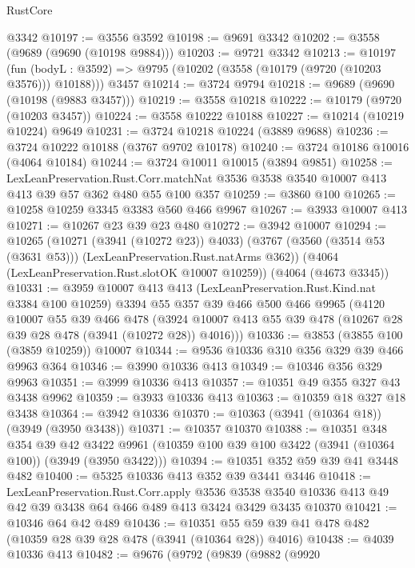 \begin{lexlean}{RustCore}
\begin{coremodule}
    @3342
@10197 := @3556 @3592
@10198 := @9691 @3342
@10202 := @3558 (@9689 (@9690 (@10198 @9884)))
@10203 := @9721 @3342
@10213 := @10197
    (fun (bodyL : @3592) => @9795 (@10202 (@3558 (@10179 (@9720 (@10203 @3576))) @10188)))
    @3457
@10214 := @3724 @9794
@10218 := @9689 (@9690 (@10198 (@9883 @3457)))
@10219 := @3558 @10218
@10222 := @10179 (@9720 (@10203 @3457))
@10224 := @3558 @10222 @10188
@10227 := @10214 (@10219 @10224) @9649
@10231 := @3724 @10218 @10224 (@3889 @9688)
@10236 := @3724 @10222 @10188 (@3767 @9702 @10178)
@10240 := @3724 @10186 @10016 (@4064 @10184)
@10244 := @3724 @10011 @10015 (@3894 @9851)
@10258 := LexLeanPreservation.Rust.Corr.matchNat
    @3536
    @3538
    @3540
    @10007
    @413
    @413
    @39
    @57
    @362
    @480
    @55
    @100
    @357
@10259 := @3860 @100
@10265 := @10258 @10259 @3345 @3383 @560 @466 @9967
@10267 := @3933 @10007 @413
@10271 := @10267 @23 @39 @23 @480
@10272 := @3942 @10007
@10294 := @10265
    (@10271 (@3941 (@10272 @23)) @4033)
    (@3767 (@3560 (@3514 @53 (@3631 @53))) (LexLeanPreservation.Rust.natArms @362))
    (@4064 (LexLeanPreservation.Rust.slotOK @10007 @10259))
    (@4064 (@4673 @3345))
@10331 := @3959
    @10007
    @413
    @413
    (LexLeanPreservation.Rust.Kind.nat @3384 @100 @10259)
    @3394
    @55
    @357
    @39
    @466
    @500
    @466
    @9965
    (@4120
      @10007
      @55
      @39
      @466
      @478
      (@3924 @10007 @413 @55 @39 @478 (@10267 @28 @39 @28 @478 (@3941 (@10272 @28)) @4016)))
@10336 := @3853 (@3855 @100 (@3859 @10259)) @10007
@10344 := @9536 @10336 @310 @356 @329 @39 @466 @9963 @364
@10346 := @3990 @10336 @413
@10349 := @10346 @356 @329 @9963
@10351 := @3999 @10336 @413
@10357 := @10351 @49 @355 @327 @43 @3438 @9962
@10359 := @3933 @10336 @413
@10363 := @10359 @18 @327 @18 @3438
@10364 := @3942 @10336
@10370 := @10363 (@3941 (@10364 @18)) (@3949 (@3950 @3438))
@10371 := @10357 @10370
@10388 := @10351
    @348
    @354
    @39
    @42
    @3422
    @9961
    (@10359 @100 @39 @100 @3422 (@3941 (@10364 @100)) (@3949 (@3950 @3422)))
@10394 := @10351 @352 @59 @39 @41 @3448 @482
@10400 := @5325 @10336 @413 @352 @39 @3441 @3446
@10418 := LexLeanPreservation.Rust.Corr.apply
    @3536
    @3538
    @3540
    @10336
    @413
    @49
    @42
    @39
    @3438
    @64
    @466
    @489
    @413
    @3424
    @3429
    @3435
    @10370
@10421 := @10346 @64 @42 @489
@10436 := @10351 @55 @59 @39 @41 @478 @482 (@10359 @28 @39 @28 @478 (@3941 (@10364 @28)) @4016)
@10438 := @4039 @10336 @413
@10482 := @9676
    (@9792
      (@9839
        (@9882
          (@9920

\end{coremodule}
\end{lexlean}
